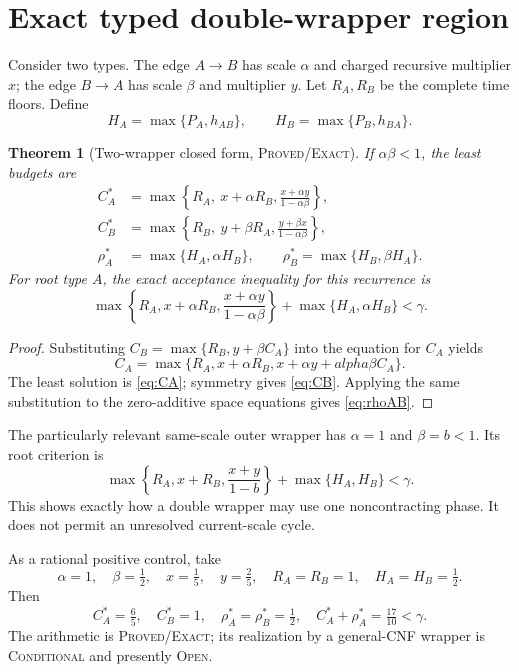 \documentclass[11pt]{article}
\newtheorem{theorem}{Theorem}[section]
\begin{document}
\section{Exact typed double-wrapper region}

Consider two types.  The edge \(A\to B\) has scale \(\alpha\) and charged
recursive multiplier \(x\); the edge \(B\to A\) has scale \(\beta\) and
multiplier \(y\).  Let \(R_A,R_B\) be the complete time floors.  Define
\[
 H_A=\max\{P_A,h_{AB}\},\qquad
 H_B=\max\{P_B,h_{BA}\}.
\]

\begin{theorem}[Two-wrapper closed form, \textsc{Proved/Exact}]
If \(\alpha\beta<1\), the least budgets are
\begin{align}
 C_A^*&=\max\left\{R_A,\ x+\alpha R_B,
             \frac{x+\alpha y}{1-\alpha\beta}\right\},\label{eq:CA}\\
 C_B^*&=\max\left\{R_B,\ y+\beta R_A,
             \frac{y+\beta x}{1-\alpha\beta}\right\},\label{eq:CB}\\
 \rho_A^*&=\max\{H_A,\alpha H_B\},\qquad
 \rho_B^*=\max\{H_B,\beta H_A\}.\label{eq:rhoAB}
\end{align}
For root type \(A\), the exact acceptance inequality for this recurrence is
\begin{equation}
 \boxed{
 \max\left\{R_A,x+\alpha R_B,
       \frac{x+\alpha y}{1-\alpha\beta}\right\}
 +\max\{H_A,\alpha H_B\}<\gamma.}
 \label{eq:doubleaccept}
\end{equation}
\end{theorem}

\begin{proof}
Substituting
\(C_B=\max\{R_B,y+\beta C_A\}\) into the equation for \(C_A\) yields
\[
 C_A=\max\{R_A,x+\alpha R_B,x+\alpha y+alpha\beta C_A\}.
\]
The least solution is \eqref{eq:CA}; symmetry gives \eqref{eq:CB}.  Applying
the same substitution to the zero-additive space equations gives
\eqref{eq:rhoAB}.
\end{proof}

The particularly relevant same-scale outer wrapper has \(\alpha=1\) and
\(\beta=b<1\).  Its root criterion is
\begin{equation}
 \boxed{
 \max\left\{R_A,x+R_B,\frac{x+y}{1-b}\right\}
 +\max\{H_A,H_B\}<\gamma.}
 \label{eq:samescaleouter}
\end{equation}
This shows exactly how a double wrapper may use one noncontracting phase.  It
does not permit an unresolved current-scale cycle.

As a rational positive control, take
\[
 \alpha=1,\quad\beta=\tfrac12,\quad
 x=\tfrac15,\quad y=\tfrac25,\quad
 R_A=R_B=1,\quad H_A=H_B=\tfrac12.
\]
Then
\[
 C_A^*=\tfrac65,\quad C_B^*=1,
 \quad\rho_A^*=\rho_B^*=\tfrac12,
 \quad C_A^*+\rho_A^*=\tfrac{17}{10}<\gamma.
\]
The arithmetic is \textsc{Proved/Exact}; its realization by a general-CNF
wrapper is \textsc{Conditional} and presently \textsc{Open}.
\end{document}
